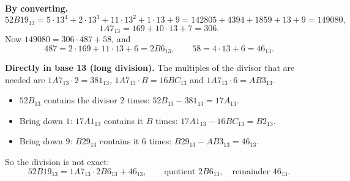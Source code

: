 \textbf{By converting.}
\[52B19_{13}=5\cdot13^4+2\cdot13^3+11\cdot13^2+1\cdot13+9=142805+4394+1859+13+9=149080,\]
\[1A7_{13}=169+10\cdot13+7=306 .\]
Now $149080=306\cdot487+58$, and
\[487=2\cdot169+11\cdot13+6=2B6_{13},\qquad 58=4\cdot13+6=46_{13}.\]

\textbf{Directly in base 13 (long division).} The multiples of the divisor that are needed are $1A7_{13}\cdot2=381_{13}$, $1A7_{13}\cdot B=16BC_{13}$ and $1A7_{13}\cdot6=AB3_{13}$.
\begin{itemize}
\item $52B_{13}$ contains the divisor $2$ times: $52B_{13}-381_{13}=17A_{13}$.
\item Bring down $1$: $17A1_{13}$ contains it $B$ times: $17A1_{13}-16BC_{13}=B2_{13}$.
\item Bring down $9$: $B29_{13}$ contains it $6$ times: $B29_{13}-AB3_{13}=46_{13}$.
\end{itemize}
So the division is not exact:
\[52B19_{13}=1A7_{13}\cdot2B6_{13}+46_{13},\qquad\text{quotient }\boxed{2B6_{13}},\quad\text{remainder }\boxed{46_{13}}.\]
